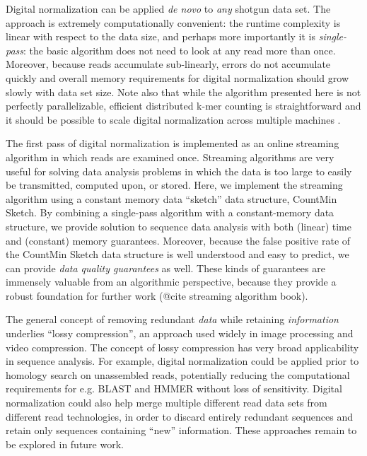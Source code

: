 \documentclass[10pt]{article}
\begin{document}
Digital normalization can be applied {\em de novo} to {\em any}
shotgun data set.  The approach is extremely computationally
convenient: the runtime complexity is linear with respect to the data
size, and perhaps more importantly it is {\em single-pass}: the basic
algorithm does not need to look at any read more than once.  Moreover,
because reads accumulate sub-linearly, errors do not accumulate
quickly and overall memory requirements for digital normalization
should grow slowly with data set size.  Note also that while the
algorithm presented here is not perfectly parallelizable, efficient
distributed k-mer counting is straightforward and it should be
possible to scale digital normalization across multiple machines
\cite{pubmed19357099}.

The first pass of digital normalization is implemented as an online
streaming algorithm in which reads are examined once.  Streaming
algorithms are very useful for solving data analysis problems in which
the data is too large to easily be transmitted, computed upon, or
stored.  Here, we implement the streaming algorithm using a constant
memory data ``sketch'' data structure, CountMin Sketch.  By combining
a single-pass algorithm with a constant-memory data structure, we
provide solution to sequence data analysis with both (linear) time and
(constant) memory guarantees. Moreover, because the false positive
rate of the CountMin Sketch data structure is well understood and easy
to predict, we can provide {\em data quality guarantees} as well.
These kinds of guarantees are immensely valuable from an algorithmic
perspective, because they provide a robust foundation for further work
(@cite streaming algorithm book).


The general concept of removing redundant {\em data} while retaining
{\em information} underlies ``lossy compression'', an approach used
widely in image processing and video compression.  The concept of
lossy compression has very broad applicability in sequence analysis.
For example, digital normalization could be applied prior to homology
search on unassembled reads, potentially reducing the computational
requirements for e.g. BLAST and HMMER without loss of sensitivity.
Digital normalization could also help merge multiple different read
data sets from different read technologies, in order to discard
entirely redundant sequences and retain only sequences containing
``new'' information.  These approaches remain to be explored in future
work.
\end{document}
